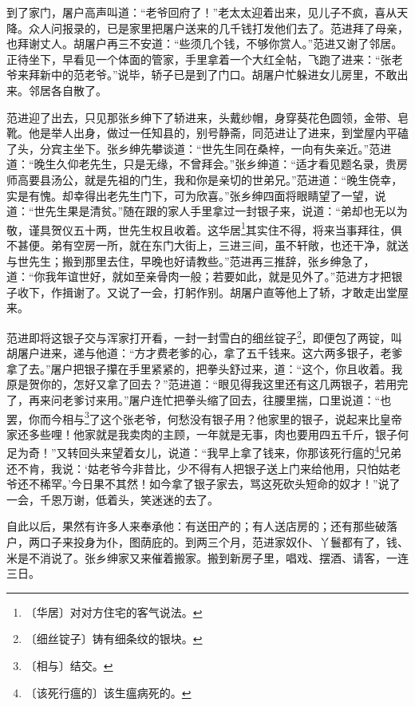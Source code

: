 \documentclass[12pt,UTF-8,openany]{ctexbook}
\begin{document}
\begin{normalsize}
    到了家门，屠户高声叫道：“老爷回府了！”老太太迎着出来，见儿子不疯，喜从天降。众人问报录的，已是家里把屠户送来的几千钱打发他们去了。范进拜了母亲，也拜谢丈人。胡屠户再三不安道：“些须几个钱，不够你赏人。”范进又谢了邻居。正待坐下，早看见一个体面的管家，手里拿着一个大红全帖，飞跑了进来：“张老爷来拜新中的范老爷。”说毕，轿子已是到了门口。胡屠户忙躲进女儿房里，不敢出来。邻居各自散了。
    
    范进迎了出去，只见那张乡绅下了轿进来，头戴纱帽，身穿葵花色圆领，金带、皂靴。他是举人出身，做过一任知县的，别号静斋，同范进让了进来，到堂屋内平磕了头，分宾主坐下。张乡绅先攀谈道：“世先生同在桑梓，一向有失亲近。”范进道：“晚生久仰老先生，只是无缘，不曾拜会。”张乡绅道：“适才看见题名录，贵房师高要县汤公，就是先祖的门生，我和你是亲切的世弟兄。”范进道：“晚生侥幸，实是有愧。却幸得出老先生门下，可为欣喜。”张乡绅四面将眼睛望了一望，说道：“世先生果是清贫。”随在跟的家人手里拿过一封银子来，说道：“弟却也无以为敬，谨具贺仪五十两，世先生权且收着。这华居\footnote{〔华居〕对对方住宅的客气说法。}其实住不得，将来当事拜往，俱不甚便。弟有空房一所，就在东门大街上，三进三间，虽不轩敞，也还干净，就送与世先生；搬到那里去住，早晚也好请教些。”范进再三推辞，张乡绅急了，道：“你我年谊世好，就如至亲骨肉一般；若要如此，就是见外了。”范进方才把银子收下，作揖谢了。又说了一会，打躬作别。胡屠户直等他上了轿，才敢走出堂屋来。
    
    范进即将这银子交与浑家打开看，一封一封雪白的细丝锭子\footnote{〔细丝锭子〕铸有细条纹的银块。}，即便包了两锭，叫胡屠户进来，递与他道：“方才费老爹的心，拿了五千钱来。这六两多银子，老爹拿了去。”屠户把银子攥在手里紧紧的，把拳头舒过来，道：“这个，你且收着。我原是贺你的，怎好又拿了回去？”范进道：“眼见得我这里还有这几两银子，若用完了，再来问老爹讨来用。”屠户连忙把拳头缩了回去，往腰里揣，口里说道：“也罢，你而今相与\footnote{〔相与〕结交。}了这个张老爷，何愁没有银子用？他家里的银子，说起来比皇帝家还多些哩！他家就是我卖肉的主顾，一年就是无事，肉也要用四五千斤，银子何足为奇！”又转回头来望着女儿，说道：“我早上拿了钱来，你那该死行瘟的\footnote{〔该死行瘟的〕该生瘟病死的。}兄弟还不肯，我说：‘姑老爷今非昔比，少不得有人把银子送上门来给他用，只怕姑老爷还不稀罕。’今日果不其然！如今拿了银子家去，骂这死砍头短命的奴才！”说了一会，千恩万谢，低着头，笑迷迷的去了。
    
    自此以后，果然有许多人来奉承他：有送田产的；有人送店房的；还有那些破落户，两口子来投身为仆，图荫庇的。到两三个月，范进家奴仆、丫鬟都有了，钱、米是不消说了。张乡绅家又来催着搬家。搬到新房子里，唱戏、摆酒、请客，一连三日。
    
\end{normalsize}
\end{document}

